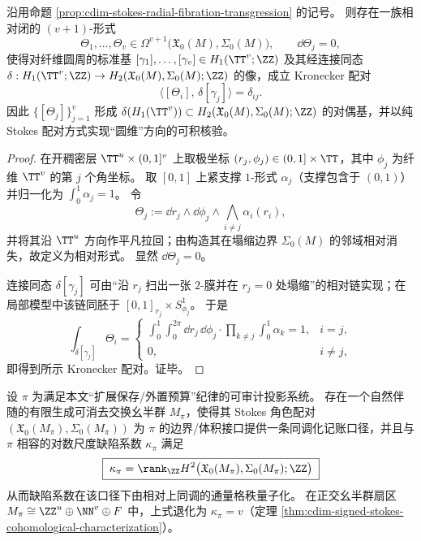 \begin{proposition}\label{prop:cdim-torus-collapse-relative-forms}
沿用命题 \ref{prop:cdim-stokes-radial-fibration-transgression} 的记号。
则存在一族相对闭的 \((v{+}1)\)-形式
\[
\Theta_1,\dots,\Theta_v\in \Omega^{v+1}\bigl(\mathfrak X_0(M),\Sigma_0(M)\bigr),
\qquad \dd\Theta_j=0,
\]
使得对纤维圆周的标准基 \([\gamma_1],\dots,[\gamma_v]\in H_1(\TT^v;\ZZ)\) 及其经连接同态
\(
\delta:H_1(\TT^v;\ZZ)\to H_2(\mathfrak X_0(M),\Sigma_0(M);\ZZ)
\)
的像，成立 Kronecker 配对
\[
\boxed{\;\bigl\langle[\Theta_i],\,\delta[\gamma_j]\bigr\rangle=\delta_{ij}.\;}
\]
因此 \(\{[\Theta_j]\}_{j=1}^v\) 形成 \(\delta(H_1(\TT^v))\subset H_2(\mathfrak X_0(M),\Sigma_0(M);\ZZ)\) 的对偶基，并以纯 Stokes 配对方式实现“圆维”方向的可积核验。
\end{proposition}
\begin{proof}
在开稠密层 \(\TT^{u}\times(0,1]^v\) 上取极坐标 \((r_j,\phi_j)\in(0,1]\times\TT\)，其中 \(\phi_j\) 为纤维 \(\TT^v\) 的第 \(j\) 个角坐标。
取 \([0,1]\) 上紧支撑 \(1\)-形式 \(\alpha_j\)（支撑包含于 \((0,1)\)）并归一化为 \(\int_{0}^{1}\alpha_j=1\)。
令
\[
\Theta_j:=\dd r_j\wedge \dd\phi_j\wedge \bigwedge_{i\neq j}\alpha_i(r_i),
\]
并将其沿 \(\TT^u\) 方向作平凡拉回；由构造其在塌缩边界 \(\Sigma_0(M)\) 的邻域相对消失，故定义为相对形式。
显然 \(\dd\Theta_j=0\)。
\par
连接同态 \(\delta[\gamma_j]\) 可由“沿 \(r_j\) 扫出一张 \(2\)-膜并在 \(r_j=0\) 处塌缩”的相对链实现；在局部模型中该链同胚于 \([0,1]_{r_j}\times S^1_{\phi_j}\)。
于是
\[
\int_{\delta[\gamma_j]}\Theta_i
=\begin{cases}
\int_{0}^{1}\!\!\int_{0}^{2\pi}\dd r_j\,\dd\phi_j\cdot \prod_{k\ne j}\int_0^1\alpha_k=1,& i=j,\\[4pt]
0,& i\ne j,
\end{cases}
\]
即得到所示 Kronecker 配对。证毕。
\end{proof}

\begin{conjecture}\label{conj:cdim-defect-entropy-stokes-flux}
设 \(\pi\) 为满足本文“扩展保存/外置预算”纪律的可审计投影系统。
存在一个自然伴随的有限生成可消去交换幺半群 \(M_\pi\)，使得其 Stokes 角色配对
\((\mathfrak X_0(M_\pi),\Sigma_0(M_\pi))\)
为 \(\pi\) 的边界/体积接口提供一条同调化记账口径，并且与 \(\pi\) 相容的对数尺度缺陷系数
\(\kappa_\pi\) 满足
\[
\boxed{\;\kappa_\pi=\rank_{\ZZ}H^{2}\bigl(\mathfrak X_0(M_\pi),\Sigma_0(M_\pi);\ZZ\bigr)\;}
\]
从而缺陷系数在该口径下由相对上同调的通量格秩量子化。
在正交幺半群扇区 \(M_\pi\cong \ZZ^{u}\oplus \NN^{v}\oplus F\) 中，上式退化为 \(\kappa_\pi=v\)（定理 \ref{thm:cdim-signed-stokes-cohomological-characterization}）。
\end{conjecture}

